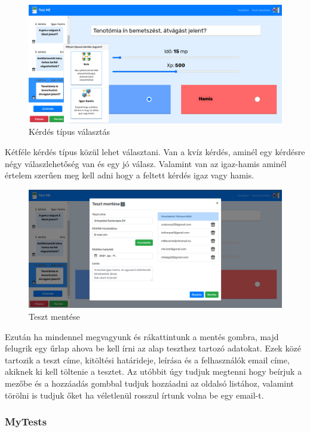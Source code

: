 \begin{figure}[H]
    \centering
    \includegraphics[width=\linewidth]{images/make_test2.png}
    \caption{Kérdés típus választás}
\end{figure}

Kétféle kérdés típus közül lehet választani. Van a kvíz kérdés, aminél egy kérdésre négy válaszlehetőség van és egy jó válasz. Valamint van az igaz-hamis aminél értelem szerűen meg kell adni hogy a feltett kérdés igaz vagy hamis.


\begin{figure}[H]
    \centering
    \includegraphics[width=\linewidth]{images/make_test3.png}
    \caption{Teszt mentése}
\end{figure}

Ezután ha mindennel megvagyunk és rákattintunk a mentés gombra, majd felugrik egy űrlap ahova be kell írni az alap teszthez tartozó adatokat. Ezek közé tartozik a teszt címe, kitöltési határideje, leírása és a felhasználók email címe, akiknek ki kell töltenie a tesztet. Az utóbbit úgy tudjuk megtenni hogy beírjuk a mezőbe és a hozzáadás gombbal tudjuk hozzáadni az oldalsó listához, valamint törölni is tudjuk őket ha véletlenül rosszul írtunk volna be egy email-t.

\subsubsection{MyTests}



